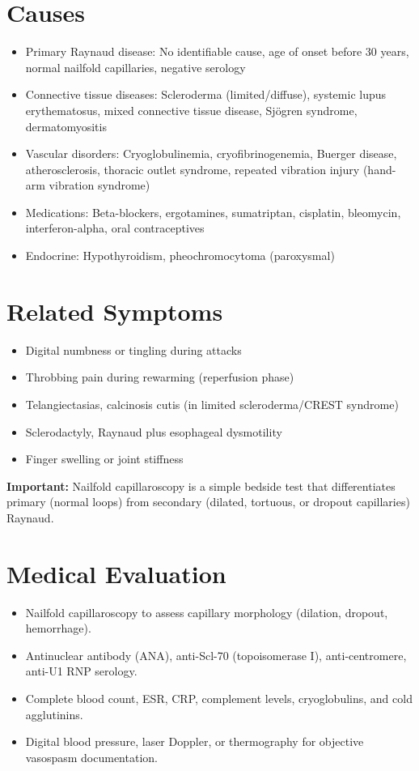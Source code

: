 \section*{Causes}
\begin{itemize}
  \item Primary Raynaud disease: No identifiable cause, age of onset before 30 years, normal nailfold capillaries, negative serology
  \item Connective tissue diseases: Scleroderma (limited/diffuse), systemic lupus erythematosus, mixed connective tissue disease, Sj\"ogren syndrome, dermatomyositis
  \item Vascular disorders: Cryoglobulinemia, cryofibrinogenemia, Buerger disease, atherosclerosis, thoracic outlet syndrome, repeated vibration injury (hand-arm vibration syndrome)
  \item Medications: Beta-blockers, ergotamines, sumatriptan, cisplatin, bleomycin, interferon-alpha, oral contraceptives
  \item Endocrine: Hypothyroidism, pheochromocytoma (paroxysmal)
\end{itemize}

\section*{Related Symptoms}
\begin{itemize}
  \item Digital numbness or tingling during attacks
  \item Throbbing pain during rewarming (reperfusion phase)
  \item Telangiectasias, calcinosis cutis (in limited scleroderma/CREST syndrome)
  \item Sclerodactyly, Raynaud plus esophageal dysmotility
  \item Finger swelling or joint stiffness
\end{itemize}
\textbf{Important:} Nailfold capillaroscopy is a simple bedside test that differentiates primary (normal loops) from secondary (dilated, tortuous, or dropout capillaries) Raynaud.

\section*{Medical Evaluation}
\begin{itemize}
  \item Nailfold capillaroscopy to assess capillary morphology (dilation, dropout, hemorrhage).
  \item Antinuclear antibody (ANA), anti-Scl-70 (topoisomerase I), anti-centromere, anti-U1 RNP serology.
  \item Complete blood count, ESR, CRP, complement levels, cryoglobulins, and cold agglutinins.
  \item Digital blood pressure, laser Doppler, or thermography for objective vasospasm documentation.
\end{itemize}

